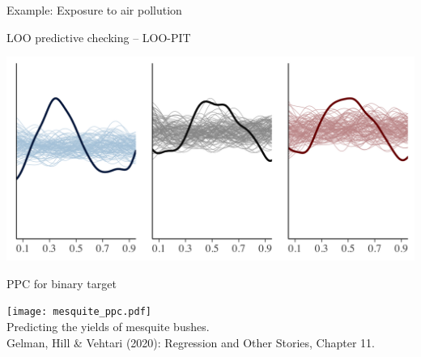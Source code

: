 \documentclass[t]{beamer}
\begin{document}
\begin{frame}{Example: Exposure to air pollution}


  LOO predictive checking -- LOO-PIT

\includegraphics[width=\textwidth]{ppc_loo_pit_corrected_pm25.png}



\end{frame}

\begin{frame}{PPC for binary target}
  
    \texttt{[image: mesquite\_ppc.pdf]}\\
  \vspace{-0.1\baselineskip} {Predicting the yields of mesquite bushes.\\
    \color{gray} \footnotesize
    Gelman, Hill \& Vehtari (2020): Regression and Other Stories, Chapter 11.}\\

\end{frame}
\end{document}
